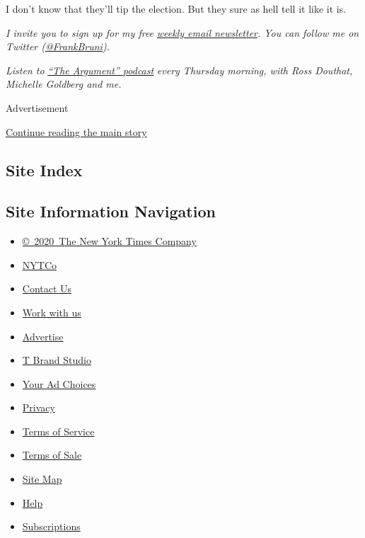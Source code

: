 I don't know that they'll tip the election. But they sure as hell tell
it like it is.

\emph{I invite you to sign up for my free}
\href{https://www.nytimes3xbfgragh.onion/newsletters/frank-bruni}{\emph{weekly
email newsletter}}\emph{. You can follow me on Twitter
(}\href{https://twitter.com/FrankBruni}{\emph{@FrankBruni}}\emph{).}

\emph{Listen to}
\href{https://www.nytimes3xbfgragh.onion/column/the-argument}{\emph{``The
Argument'' podcast}} \emph{every Thursday morning, with Ross Douthat,
Michelle Goldberg and me.}

Advertisement

\protect\hyperlink{after-bottom}{Continue reading the main story}

\hypertarget{site-index}{%
\subsection{Site Index}\label{site-index}}

\hypertarget{site-information-navigation}{%
\subsection{Site Information
Navigation}\label{site-information-navigation}}

\begin{itemize}
\tightlist
\item
  \href{https://help.nytimes3xbfgragh.onion/hc/en-us/articles/115014792127-Copyright-notice}{©~2020~The
  New York Times Company}
\end{itemize}

\begin{itemize}
\tightlist
\item
  \href{https://www.nytco.com/}{NYTCo}
\item
  \href{https://help.nytimes3xbfgragh.onion/hc/en-us/articles/115015385887-Contact-Us}{Contact
  Us}
\item
  \href{https://www.nytco.com/careers/}{Work with us}
\item
  \href{https://nytmediakit.com/}{Advertise}
\item
  \href{http://www.tbrandstudio.com/}{T Brand Studio}
\item
  \href{https://www.nytimes3xbfgragh.onion/privacy/cookie-policy\#how-do-i-manage-trackers}{Your
  Ad Choices}
\item
  \href{https://www.nytimes3xbfgragh.onion/privacy}{Privacy}
\item
  \href{https://help.nytimes3xbfgragh.onion/hc/en-us/articles/115014893428-Terms-of-service}{Terms
  of Service}
\item
  \href{https://help.nytimes3xbfgragh.onion/hc/en-us/articles/115014893968-Terms-of-sale}{Terms
  of Sale}
\item
  \href{https://spiderbites.nytimes3xbfgragh.onion}{Site Map}
\item
  \href{https://help.nytimes3xbfgragh.onion/hc/en-us}{Help}
\item
  \href{https://www.nytimes3xbfgragh.onion/subscription?campaignId=37WXW}{Subscriptions}
\end{itemize}
